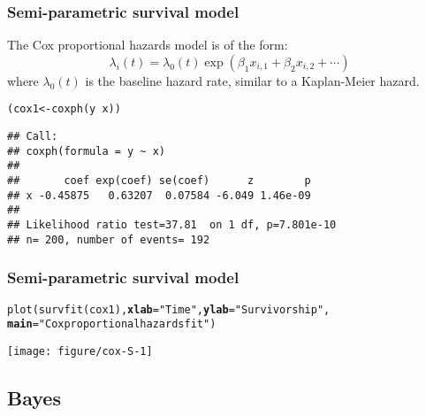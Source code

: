 \documentclass[color=usenames,dvipsnames]{beamer}\usepackage[]{graphicx}\usepackage[]{color}
\makeatletter
\newcommand{\hlstr}[1]{\textcolor[rgb]{0.749,0.012,0.012}{#1}}%
\newcommand{\hlopt}[1]{\textcolor[rgb]{0,0,0}{#1}}%
\newcommand{\hlstd}[1]{\textcolor[rgb]{0,0,0}{#1}}%
\newcommand{\hlkwb}[1]{\textcolor[rgb]{0,0.341,0.682}{#1}}%
\newcommand{\hlkwc}[1]{\textcolor[rgb]{0,0,0}{\textbf{#1}}}%
\newcommand{\hlkwd}[1]{\textcolor[rgb]{0.004,0.004,0.506}{#1}}%
\newenvironment{kframe}{%
 \def\at@end@of@kframe{}%
 \ifinner\ifhmode%
  \def\at@end@of@kframe{\end{minipage}}%
  \begin{minipage}{\columnwidth}%
 \fi\fi%
 \def\FrameCommand##1{\hskip\@totalleftmargin \hskip-\fboxsep
 \colorbox{shadecolor}{##1}\hskip-\fboxsep
     \hskip-\linewidth \hskip-\@totalleftmargin \hskip\columnwidth}%
 \MakeFramed {\advance\hsize-\width
   \@totalleftmargin\z@ \linewidth\hsize
   \@setminipage}}%
 {\par\unskip\endMakeFramed%
 \at@end@of@kframe}
\newenvironment{knitrout}{}{} %
\makeatother
\begin{document}
\begin{frame}[fragile]
  \frametitle{Semi-parametric survival model}
  The Cox proportional hazards model is of the form:
  \[
    \lambda_i(t) = \lambda_0(t)\exp(\beta_1 x_{i,1} + \beta_2 x_{i,2} + \cdots)
  \]
  where $\lambda_0(t)$ is the baseline hazard rate, similar to a
  Kaplan-Meier hazard.
  \pause \vfill
\begin{knitrout}\scriptsize
{}\color{fgcolor}\begin{kframe}
\begin{alltt}
\hlstd{(cox1} \hlkwb{<-} \hlkwd{coxph}\hlstd{(y} \hlopt{~} \hlstd{x))}
\end{alltt}
\begin{verbatim}
## Call:
## coxph(formula = y ~ x)
## 
##       coef exp(coef) se(coef)      z        p
## x -0.45875   0.63207  0.07584 -6.049 1.46e-09
## 
## Likelihood ratio test=37.81  on 1 df, p=7.801e-10
## n= 200, number of events= 192
\end{verbatim}
\end{kframe}
\end{knitrout}
\end{frame}




\begin{frame}[fragile]
  \frametitle{Semi-parametric survival model}
\begin{knitrout}\footnotesize
{}\color{fgcolor}\begin{kframe}
\begin{alltt}
\hlkwd{plot}\hlstd{(}\hlkwd{survfit}\hlstd{(cox1),} \hlkwc{xlab}\hlstd{=}\hlstr{"Time"}\hlstd{,} \hlkwc{ylab}\hlstd{=}\hlstr{"Survivorship"}\hlstd{,}
     \hlkwc{main}\hlstd{=}\hlstr{"Cox proportional hazards fit"}\hlstd{)}
\end{alltt}
\end{kframe}

{\centering \texttt{[image: figure/cox-S-1]} 

}


\end{knitrout}
\end{frame}




\subsection{Bayes}
\end{document}
